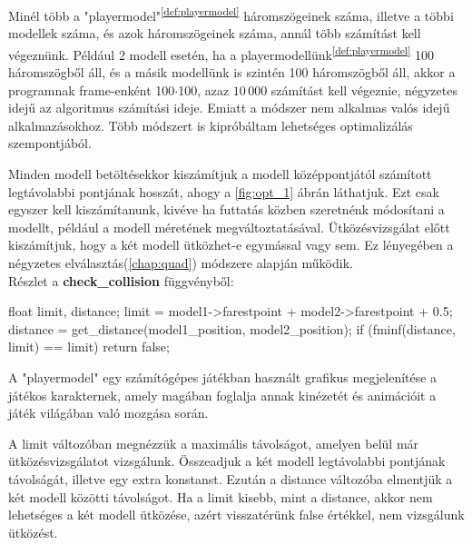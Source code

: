 
Minél több a "playermodel"\textsuperscript{\ref{def:playermodel}} háromszögeinek száma, illetve a többi modellek száma, és azok háromszögeinek száma, annál több számítást kell végeznünk. Például 2 modell esetén, ha a playermodellünk\textsuperscript{\ref{def:playermodel}} 100 háromszögből áll, és a másik modellünk is szintén 100 háromszögből áll, akkor a programnak frame-enként 100$\cdot$100, azaz $10\,000$ számítást kell végeznie, négyzetes idejű az algoritmus számítási ideje. Emiatt a módszer nem alkalmas valós idejű alkalmazásokhoz. Több módszert is kipróbáltam lehetséges optimalizálás szempontjából.

Minden modell betöltésekkor kiszámítjuk a modell középpontjától számított legtávolabbi pontjának hosszát, ahogy a \ref{fig:opt_1} ábrán láthatjuk. Ezt csak egyszer kell kiszámítanunk, kivéve ha futtatás közben szeretnénk módosítani a modellt, például a modell méretének megváltoztatásával. Ütközésvizsgálat előtt kiszámítjuk, hogy a két modell ütközhet-e egymással vagy sem. Ez lényegében a négyzetes elválasztás(\ref{chap:quad}) módszere alapján működik.
\\
Részlet a \textbf{check\_collision} függvényből:
\begin{cpp}
float limit, distance;
limit = model1->farestpoint + model2->farestpoint + 0.5;
distance = get_distance(model1_position, model2_position);
if (fminf(distance, limit) == limit)
{
    return false;
}
\end{cpp}

\vfill
\begin{definition}[Playermodel]
	A "playermodel" egy számítógépes játékban használt grafikus megjelenítése a játékos karakternek, amely magában foglalja annak kinézetét és animációit a játék világában való mozgása során.
	\label{def:playermodel}
\end{definition}
\newpage
A limit változóban megnézzük a maximális távolságot, amelyen belül már ütközésvizsgálatot vizsgálunk. Összeadjuk a két modell legtávolabbi pontjának távolságát, illetve egy extra konstanst. Ezután a distance változóba elmentjük a két modell közötti távolságot. Ha a limit kisebb, mint a distance, akkor nem lehetséges a két modell ütközése, azért visszatérünk false értékkel, nem vizsgálunk ütközést.

